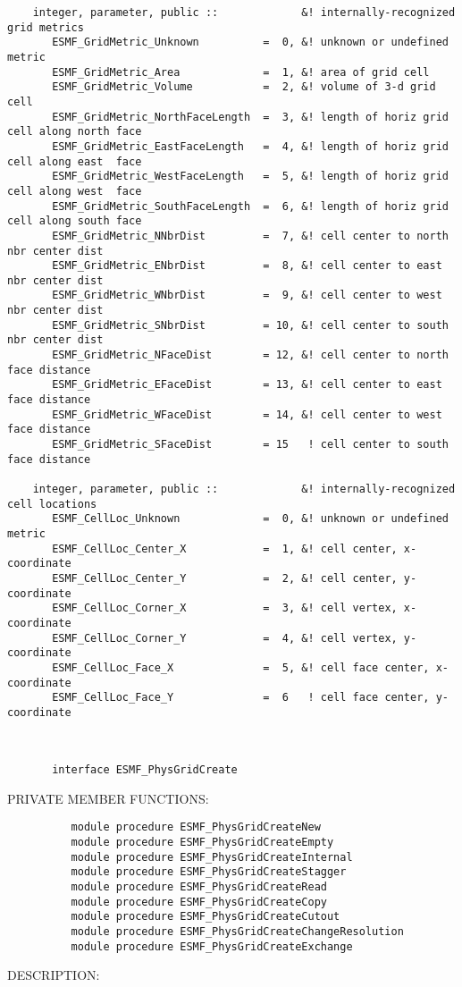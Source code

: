 \begin{verbatim} 
    integer, parameter, public ::             &! internally-recognized grid metrics
       ESMF_GridMetric_Unknown          =  0, &! unknown or undefined metric
       ESMF_GridMetric_Area             =  1, &! area of grid cell
       ESMF_GridMetric_Volume           =  2, &! volume of 3-d grid cell
       ESMF_GridMetric_NorthFaceLength  =  3, &! length of horiz grid cell along north face
       ESMF_GridMetric_EastFaceLength   =  4, &! length of horiz grid cell along east  face
       ESMF_GridMetric_WestFaceLength   =  5, &! length of horiz grid cell along west  face
       ESMF_GridMetric_SouthFaceLength  =  6, &! length of horiz grid cell along south face
       ESMF_GridMetric_NNbrDist         =  7, &! cell center to north nbr center dist
       ESMF_GridMetric_ENbrDist         =  8, &! cell center to east  nbr center dist
       ESMF_GridMetric_WNbrDist         =  9, &! cell center to west  nbr center dist
       ESMF_GridMetric_SNbrDist         = 10, &! cell center to south nbr center dist
       ESMF_GridMetric_NFaceDist        = 12, &! cell center to north face distance
       ESMF_GridMetric_EFaceDist        = 13, &! cell center to east  face distance
       ESMF_GridMetric_WFaceDist        = 14, &! cell center to west  face distance
       ESMF_GridMetric_SFaceDist        = 15   ! cell center to south face distance
 
    integer, parameter, public ::             &! internally-recognized cell locations
       ESMF_CellLoc_Unknown             =  0, &! unknown or undefined metric
       ESMF_CellLoc_Center_X            =  1, &! cell center, x-coordinate  
       ESMF_CellLoc_Center_Y            =  2, &! cell center, y-coordinate  
       ESMF_CellLoc_Corner_X            =  3, &! cell vertex, x-coordinate  
       ESMF_CellLoc_Corner_Y            =  4, &! cell vertex, y-coordinate  
       ESMF_CellLoc_Face_X              =  5, &! cell face center, x-coordinate  
       ESMF_CellLoc_Face_Y              =  6   ! cell face center, y-coordinate  
 \end{verbatim}
 
 
\mbox{}\hrulefill\ 
 

\begin{verbatim}       interface ESMF_PhysGridCreate
 \end{verbatim}{\sf PRIVATE MEMBER FUNCTIONS:}
\begin{verbatim}          module procedure ESMF_PhysGridCreateNew
          module procedure ESMF_PhysGridCreateEmpty
          module procedure ESMF_PhysGridCreateInternal
          module procedure ESMF_PhysGridCreateStagger
          module procedure ESMF_PhysGridCreateRead
          module procedure ESMF_PhysGridCreateCopy
          module procedure ESMF_PhysGridCreateCutout
          module procedure ESMF_PhysGridCreateChangeResolution
          module procedure ESMF_PhysGridCreateExchange
 \end{verbatim}
{\sf DESCRIPTION:\\ }


